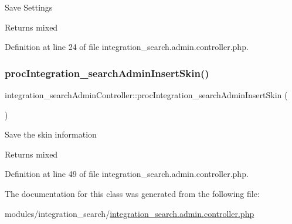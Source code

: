 Save Settings

\begin{DoxyReturn}{Returns}
mixed 
\end{DoxyReturn}


Definition at line 24 of file integration\+\_\+search.\+admin.\+controller.\+php.

\mbox{\label{classintegration__searchAdminController_a5bd4a4873fc65c94684beea688448f45}} 
\subsubsection{\texorpdfstring{proc\+Integration\+\_\+search\+Admin\+Insert\+Skin()}{procIntegration\_searchAdminInsertSkin()}}
{\footnotesize\ttfamily integration\+\_\+search\+Admin\+Controller\+::proc\+Integration\+\_\+search\+Admin\+Insert\+Skin (\begin{DoxyParamCaption}{ }\end{DoxyParamCaption})}

Save the skin information

\begin{DoxyReturn}{Returns}
mixed 
\end{DoxyReturn}


Definition at line 49 of file integration\+\_\+search.\+admin.\+controller.\+php.



The documentation for this class was generated from the following file\+:\begin{DoxyCompactItemize}
\item 
modules/integration\+\_\+search/\hyperlink{integration__search_8admin_8controller_8php}{integration\+\_\+search.\+admin.\+controller.\+php}\end{DoxyCompactItemize}
